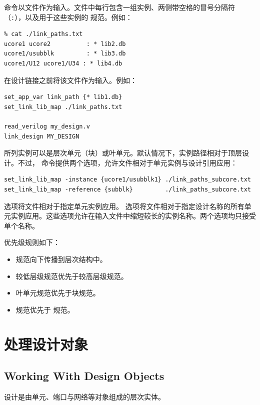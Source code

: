 命令以文件作为输入。文件中每行包含一组实例、两侧带空格的冒号分隔符（\texttt{:}），以及用于这些实例的  规范。例如：
\begin{lstlisting}
% cat ./link_paths.txt
ucore1 ucore2          : * lib2.db
ucore1/usubblk         : * lib3.db
ucore1/U12 ucore1/U34 : * lib4.db
\end{lstlisting}

 在设计链接之前将该文件作为输入。例如：
\begin{lstlisting}
set_app_var link_path {* lib1.db}
set_link_lib_map ./link_paths.txt

read_verilog my_design.v
link_design MY_DESIGN
\end{lstlisting}

所列实例可以是层次单元（块）或叶单元。默认情况下，实例路径相对于顶层设计。不过， 命令提供两个选项，允许文件相对于单元实例与设计引用应用：
\begin{lstlisting}
set_link_lib_map -instance {ucore1/usubblk1} ./link_paths_subcore.txt
set_link_lib_map -reference {subblk}         ./link_paths_subcore.txt
\end{lstlisting}

 选项将文件相对于指定单元实例应用。 选项将文件相对于指定设计名称的所有单元实例应用。这些选项允许在输入文件中缩短较长的实例名称。两个选项均只接受单个名称。

优先级规则如下：
\begin{itemize}
  \item 规范向下传播到层次结构中。
  \item 较低层级规范优先于较高层级规范。
  \item 叶单元规范优先于块规范。
  \item {} 规范优先于  规范。
\end{itemize}

\section{处理设计对象}
\subsection*{Working With Design Objects}

设计是由单元、端口与网络等对象组成的层次实体。


